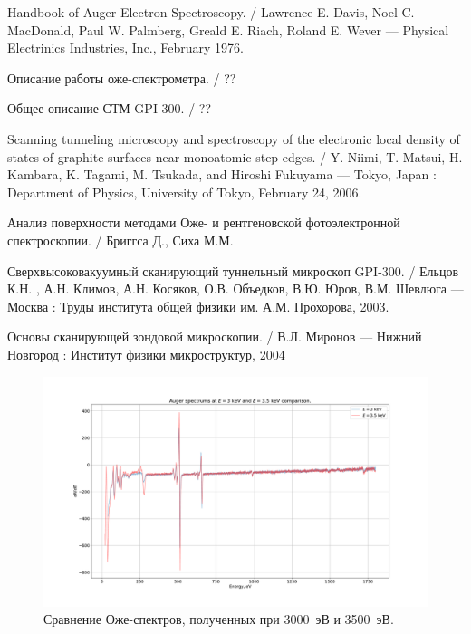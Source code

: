 \documentclass[a4paper, 12pt]{article}
\begin{document}
	\begin{thebibliography}{2}
		
		 Handbook of Auger Electron Spectroscopy. /  Lawrence E. Davis, Noel C. MacDonald, Paul W. Palmberg, Greald E. Riach, Roland E. Wever --- Physical Electrinics Industries, Inc., February 1976.
		
		 Описание работы оже-спектрометра. / ??
		
		 Общее описание СТМ GPI-300. / ??
		
		 Scanning tunneling microscopy and spectroscopy of the electronic local density of states of graphite surfaces near monoatomic step edges. / Y. Niimi, T. Matsui, H. Kambara, K. Tagami, M. Tsukada, and Hiroshi Fukuyama --- Tokyo, Japan : Department of Physics, University of Tokyo, February 24, 2006.
		
		 Анализ поверхности методами Оже- и рентгеновской фотоэлектронной спектроскопии. / Бриггса Д., Сиха М.М.
		
		 Сверхвысоковакуумный сканирующий туннельный микроскоп GPI-300. / Ельцов К.Н. , А.Н. Климов, А.Н. Косяков, О.В. Объедков, В.Ю. Юров, В.М. Шевлюга --- Москва : Труды института общей физики им. А.М. Прохорова, 2003.
		
		 Основы сканирующей зондовой микроскопии. / В.Л. Миронов --- Нижний Новгород : Институт физики микроструктур, 2004
		
	\end{thebibliography}
	
	
	\newpage
	
	
	\begin{figure}[H]
		\centering
		\includegraphics[width=1.3\linewidth, angle=-90]{1_Auge_double}
		\caption{Сравнение Оже-спектров, полученных при 3000~эВ и 3500~эВ.}
		\label{fig:1_Auge_double}
	\end{figure}
	
\end{document}
